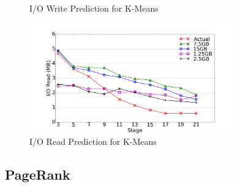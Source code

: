 {\begin{figure}[!t]
\caption{I/O Write Prediction for K-Means}
\label{km_io_w}
\end{figure}
\begin{figure}[!t]
\centering
\includegraphics[width=3.5in]{figures/km_io_r.png}
\caption{I/O Read Prediction for K-Means}
\label{km_io_r}
\end{figure}




\subsection{PageRank}

}
